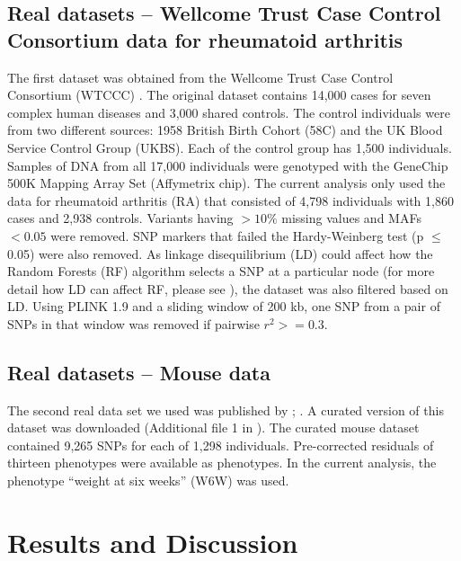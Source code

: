 \documentclass[preprint,12pt,3p]{elsarticle}
\begin{document}
\subsection{Real datasets -- Wellcome Trust Case Control Consortium data for rheumatoid arthritis}
\label{subsection: rheumatoid}
The first dataset was obtained from the Wellcome Trust Case Control Consortium (WTCCC)
\cite[]{burtonGenomewideAssociationStudy2007brief}. The original dataset contains 14,000 cases for seven complex human
diseases and 3,000 shared controls. The control individuals were from two different sources: 1958 British Birth Cohort
(58C) and the UK Blood Service Control Group (UKBS). Each of the control group has 1,500 individuals. Samples of DNA
from all 17,000 individuals were genotyped with the GeneChip 500K Mapping Array Set (Affymetrix chip).  The current
analysis only used the data for rheumatoid arthritis (RA) that consisted of 4,798 individuals with 1,860 cases and 2,938
controls. Variants having $>10\%$ missing values and MAFs$<0.05$ were removed. SNP markers that failed the
Hardy-Weinberg test (p $\leq$ 0.05) were also removed. As linkage disequilibrium (LD) could affect how the Random Forests
(RF) algorithm selects a SNP at a particular node (for more detail how LD can affect RF, please see
\cite{mengPerformanceRandomForest2009}), the dataset was also filtered based on LD. Using PLINK 1.9
\cite[]{purcellPLINKToolSet2007} and a sliding window of 200 kb, one SNP from a pair of SNPs in that window was removed
if pairwise $r^2 >=0.3$.


\subsection{Real datasets -- Mouse data}
The second real data set we used was published by \cite{solbergProtocolHighthroughputPhenotyping2006};
\cite{valdarGeneticEnvironmentalEffects2006}. A curated version of this dataset was downloaded (Additional file 1 in
\cite{martiniGenomicPredictionEpistasis2017}). The curated mouse dataset contained 9,265 SNPs for each of 1,298
individuals. Pre-corrected residuals of thirteen phenotypes were available as phenotypes. In the current analysis, the
phenotype ``weight at six weeks'' (W6W) was used.



\section{Results and Discussion}
\end{document}
